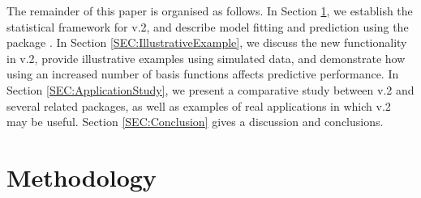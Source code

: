 \documentclass[nojss]{jss}
\begin{document}





The remainder of this paper is organised as follows. 
In Section \ref{SEC:Methodology}, we establish the statistical framework for  v.2, and describe model fitting and prediction using the  package  \citep{Kristensen_2016_TMB}. 
In Section \ref{SEC:IllustrativeExample}, we discuss the new functionality in  v.2, provide illustrative examples using simulated data, %
 and demonstrate how using an increased number of basis functions affects predictive performance. %
In Section \ref{SEC:ApplicationStudy}, we present a comparative study between  v.2 and several related packages, as well as examples of real applications in which  v.2 may be useful.  
Section \ref{SEC:Conclusion} gives a discussion and conclusions. 

\section{Methodology}\label{SEC:Methodology}
\end{document}
